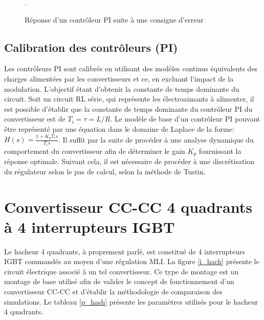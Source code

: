 \begin{figure}[htb]
\caption{Réponse d'un contrôleur PI suite à une consigne d'erreur}.
\label{PI}
\end{figure}

\clearpage
\subsection{Calibration des contrôleurs (PI)}
Les contrôleurs PI sont calibrés en utilisant des modèles continus équivalents des charges alimentées par les convertisseurs et ce, en excluant l'impact de la modulation. L'objectif étant d'obtenir la constante de temps dominante du circuit. Soit un circuit RL série, qui représente les électroaimants à alimenter, il est possible d'établir que la constante de temps dominante du contrôleur PI du convertisseur est de $T_i = \tau = L/R$. Le modèle de base d'un contrôleur PI pouvant être représenté par une équation dans le domaine de Laplace de la forme: $H(s) = \frac{1 + K_p T_is}{T_i s}$. Il suffit par la suite de procéder à une analyse dynamique du comportement du convertisseur afin de déterminer le gain $K_p$ fournissant la réponse optimale. Suivant cela, il est nécessaire de procéder à une discrétisation du régulateur selon le pas de calcul, selon la méthode de Tustin. 
\section{Convertisseur CC-CC 4 quadrants à 4 interrupteurs IGBT}
Le hacheur 4 quadrants, à proprement parlé, est constitué de 4 interrupteurs IGBT commandés au moyen d'une régulation MLI. La figure \ref{i_hach} présente le circuit électrique associé à un tel convertisseur. Ce type de montage est un montage de base utilisé afin de valider le concept de fonctionnement d'un convertisseur CC-CC et d'établir la méthodologie de comparaison des simulations. Le tableau \ref{p_hash} présente les paramètres utilisés pour le hacheur 4 quadrants.

